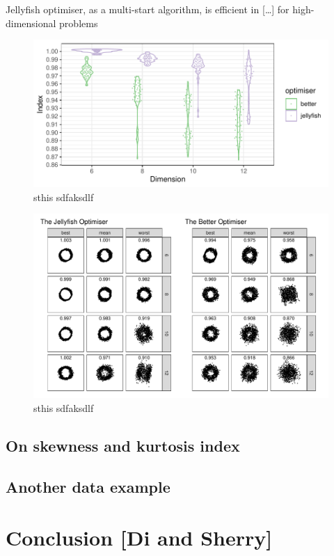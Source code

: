 \documentclass[
  number,
  preprint,
  3p]{elsarticle}
\begin{document}
Jellyfish optimiser, as a multi-start algorithm, is efficient in
{[}\ldots{]} for high-dimensional problems

\begin{figure}

{\centering \includegraphics{optim_files/figure-pdf/unnamed-chunk-4-1.pdf}

}

\caption{sthis sdfaksdlf}

\end{figure}

\begin{figure}

{\centering \includegraphics{optim_files/figure-pdf/unnamed-chunk-6-1.pdf}

}

\caption{sthis sdfaksdlf}

\end{figure}

\hypertarget{on-skewness-and-kurtosis-index}{%
\subsection{On skewness and kurtosis
index}\label{on-skewness-and-kurtosis-index}}

\hypertarget{another-data-example}{%
\subsection{Another data example}\label{another-data-example}}

\hypertarget{sec-conclusion}{%
\section{Conclusion {[}Di and Sherry{]}}\label{sec-conclusion}}


\renewcommand\refname{References}
  
\end{document}
